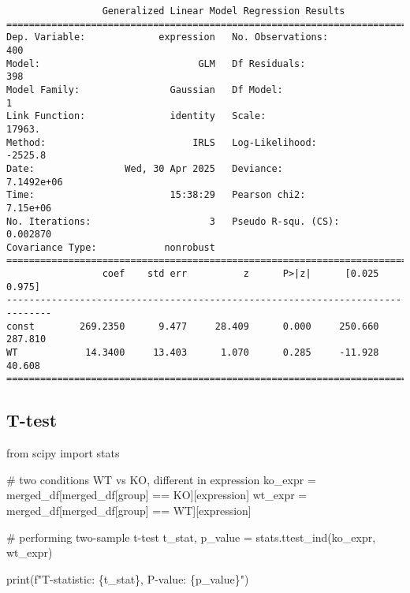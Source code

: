 \documentclass[
  letterpaper,
  DIV=11,
  numbers=noendperiod]{scrartcl}
\newenvironment{Shaded}{\begin{snugshade}}{\end{snugshade}}
\newcommand{\BuiltInTok}[1]{\textcolor[rgb]{0.00,0.23,0.31}{#1}}
\newcommand{\CommentTok}[1]{\textcolor[rgb]{0.37,0.37,0.37}{#1}}
\newcommand{\ImportTok}[1]{\textcolor[rgb]{0.00,0.46,0.62}{#1}}
\newcommand{\NormalTok}[1]{\textcolor[rgb]{0.00,0.23,0.31}{#1}}
\newcommand{\OperatorTok}[1]{\textcolor[rgb]{0.37,0.37,0.37}{#1}}
\newcommand{\SpecialCharTok}[1]{\textcolor[rgb]{0.37,0.37,0.37}{#1}}
\newcommand{\SpecialStringTok}[1]{\textcolor[rgb]{0.13,0.47,0.30}{#1}}
\newcommand{\StringTok}[1]{\textcolor[rgb]{0.13,0.47,0.30}{#1}}
\begin{document}
\begin{verbatim}
                 Generalized Linear Model Regression Results                  
==============================================================================
Dep. Variable:             expression   No. Observations:                  400
Model:                            GLM   Df Residuals:                      398
Model Family:                Gaussian   Df Model:                            1
Link Function:               identity   Scale:                          17963.
Method:                          IRLS   Log-Likelihood:                -2525.8
Date:                Wed, 30 Apr 2025   Deviance:                   7.1492e+06
Time:                        15:38:29   Pearson chi2:                 7.15e+06
No. Iterations:                     3   Pseudo R-squ. (CS):           0.002870
Covariance Type:            nonrobust                                         
==============================================================================
                 coef    std err          z      P>|z|      [0.025      0.975]
------------------------------------------------------------------------------
const        269.2350      9.477     28.409      0.000     250.660     287.810
WT            14.3400     13.403      1.070      0.285     -11.928      40.608
==============================================================================
\end{verbatim}

\subsection{T-test}\label{t-test}

\begin{Shaded}
\begin{Highlighting}[]
\ImportTok{from}\NormalTok{ scipy }\ImportTok{import}\NormalTok{ stats}

\CommentTok{\# two conditions WT vs KO, different in expression}
\NormalTok{ko\_expr }\OperatorTok{=}\NormalTok{ merged\_df[merged\_df[}\StringTok{\textquotesingle{}group\textquotesingle{}}\NormalTok{] }\OperatorTok{==} \StringTok{\textquotesingle{}KO\textquotesingle{}}\NormalTok{][}\StringTok{\textquotesingle{}expression\textquotesingle{}}\NormalTok{]}
\NormalTok{wt\_expr }\OperatorTok{=}\NormalTok{ merged\_df[merged\_df[}\StringTok{\textquotesingle{}group\textquotesingle{}}\NormalTok{] }\OperatorTok{==} \StringTok{\textquotesingle{}WT\textquotesingle{}}\NormalTok{][}\StringTok{\textquotesingle{}expression\textquotesingle{}}\NormalTok{]}

\CommentTok{\# performing two{-}sample t{-}test}
\NormalTok{t\_stat, p\_value }\OperatorTok{=}\NormalTok{ stats.ttest\_ind(ko\_expr, wt\_expr)}

\BuiltInTok{print}\NormalTok{(}\SpecialStringTok{f"T{-}statistic: }\SpecialCharTok{\{}\NormalTok{t\_stat}\SpecialCharTok{\}}\SpecialStringTok{, P{-}value: }\SpecialCharTok{\{}\NormalTok{p\_value}\SpecialCharTok{\}}\SpecialStringTok{"}\NormalTok{)}
\end{Highlighting}
\end{Shaded}
\end{document}
